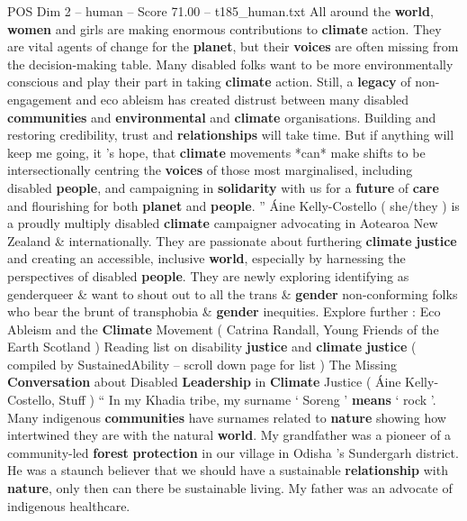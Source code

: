 \begin{textsample}{POS Dim 2 – human – Score 71.00 – t185\_human.txt}  \label{ex:f2_pos_021}
All around the \textbf{world}, \textbf{women} and girls are making enormous contributions to \textbf{climate} action.
They are vital agents of change for the \textbf{planet}, but their \textbf{voices} are often missing from the decision-making table.
Many disabled folks want to be more environmentally conscious and play their part in taking \textbf{climate} action.
Still, a \textbf{legacy} of non-engagement and eco ableism has created distrust between many disabled \textbf{communities} and \textbf{environmental} and \textbf{climate} organisations.
Building and restoring credibility, trust and \textbf{relationships} will take time.
But if anything will keep me going, it ’s hope, that \textbf{climate} movements *can* make shifts to be intersectionally centring the \textbf{voices} of those most marginalised, including disabled \textbf{people}, and campaigning in \textbf{solidarity} with us for a \textbf{future} of \textbf{care} and flourishing for both \textbf{planet} and \textbf{people}. ” Áine Kelly-Costello ( she/they ) is a proudly multiply disabled \textbf{climate} campaigner advocating in Aotearoa New Zealand \& internationally.
They are passionate about furthering \textbf{climate} \textbf{justice} and creating an accessible, inclusive \textbf{world}, especially by harnessing the perspectives of disabled \textbf{people}.
They are newly exploring identifying as genderqueer \& want to shout out to all the trans \& \textbf{gender} non-conforming folks who bear the brunt of transphobia \& \textbf{gender} inequities.
Explore further : Eco Ableism and the \textbf{Climate} Movement ( Catrina Randall, Young Friends of the Earth Scotland ) Reading list on disability \textbf{justice} and \textbf{climate} \textbf{justice} ( compiled by SustainedAbility – scroll down page for list ) The Missing \textbf{Conversation} about Disabled \textbf{Leadership} in \textbf{Climate} Justice ( Áine Kelly-Costello, Stuff ) “ In my Khadia tribe, my surname ‘ Soreng ’ \textbf{means} ‘ rock ’.
Many indigenous \textbf{communities} have surnames related to \textbf{nature} showing how intertwined they are with the natural \textbf{world}.
My grandfather was a pioneer of a community-led \textbf{forest} \textbf{protection} in our village in Odisha ’s Sundergarh district.
He was a staunch believer that we should have a sustainable \textbf{relationship} with \textbf{nature}, only then can there be sustainable living.
My father was an advocate of indigenous healthcare.

\end{textsample}
